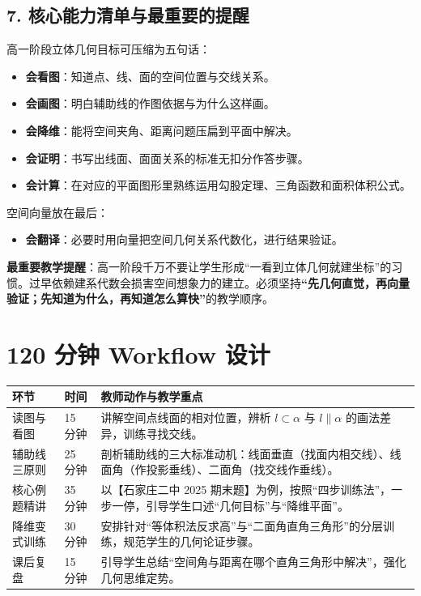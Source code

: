 \documentclass[11pt,a4paper]{ctexart}
\begin{document}
\subsection{7. 核心能力清单与最重要的提醒}
高一阶段立体几何目标可压缩为五句话：
\begin{itemize}
  \item \textbf{会看图}：知道点、线、面的空间位置与交线关系。
  \item \textbf{会画图}：明白辅助线的作图依据与为什么这样画。
  \item \textbf{会降维}：能将空间夹角、距离问题压扁到平面中解决。
  \item \textbf{会证明}：书写出线面、面面关系的标准无扣分作答步骤。
  \item \textbf{会计算}：在对应的平面图形里熟练运用勾股定理、三角函数和面积体积公式。
\end{itemize}
空间向量放在最后：
\begin{itemize}
  \item \textbf{会翻译}：必要时用向量把空间几何关系代数化，进行结果验证。
\end{itemize}
\textbf{最重要教学提醒}：高一阶段千万不要让学生形成“一看到立体几何就建坐标”的习惯。过早依赖建系代数会损害空间想象力的建立。必须坚持\textbf{“先几何直觉，再向量验证；先知道为什么，再知道怎么算快”}的教学顺序。

\section{120 分钟 Workflow 设计}

\renewcommand{\arraystretch}{1.35}
\begin{tabularx}{\textwidth}{p{2.5cm}p{2.2cm}X}
\toprule
环节 & 时间 & 教师动作与教学重点 \\
\midrule
读图与看图 & 15 分钟 & 讲解空间点线面的相对位置，辨析 $l\subset \alpha$ 与 $l\parallel \alpha$ 的画法差异，训练寻找交线。\\
辅助线三原则 & 25 分钟 & 剖析辅助线的三大标准动机：线面垂直（找面内相交线）、线面角（作投影垂线）、二面角（找交线作垂线）。\\
核心例题精讲 & 35 分钟 & 以【石家庄二中 2025 期末题】为例，按照“四步训练法”，一步一停，引导学生口述“几何目标”与“降维平面”。\\
降维变式训练 & 30 分钟 & 安排针对“等体积法反求高”与“二面角直角三角形”的分层训练，规范学生的几何论证步骤。\\
课后复盘 & 15 分钟 & 引导学生总结“空间角与距离在哪个直角三角形中解决”，强化几何思维定势。\\
\bottomrule
\end{tabularx}
\end{document}
